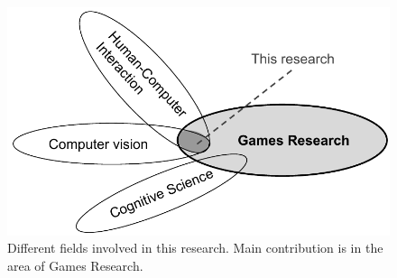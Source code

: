 \begin{figure}[h]
    \centering
    \includegraphics[scale=0.6]{Content/figures/fields}
    \caption{Different fields involved in this research. Main contribution is in the area of Games Research.}
    \label{fig:fields}
\end{figure}

